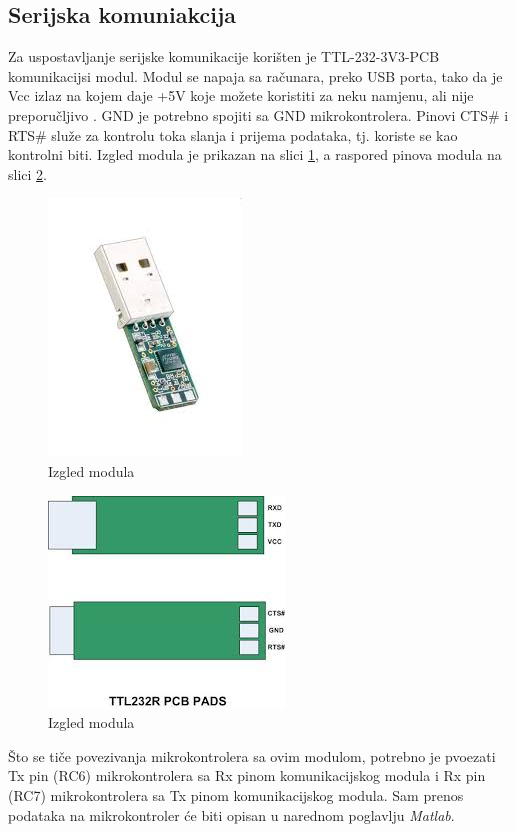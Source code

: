 \documentclass[12pt]{article}
\begin{document}
\subsection{Serijska komuniakcija}
Za uspostavljanje serijske komunikacije korišten je TTL-232-3V3-PCB komunikacijsi modul.
Modul se napaja sa računara, preko USB porta, tako da je Vcc izlaz na kojem daje +5V koje možete koristiti za neku namjenu, ali nije preporučljivo .
GND je potrebno spojiti sa GND mikrokontrolera.
Pinovi CTS# i RTS# služe za kontrolu toka
slanja i prijema podataka, tj. koriste se kao kontrolni biti. 
Izgled modula je prikazan na slici \ref{fig:izgleda}, a raspored pinova modula na slici \ref{fig:raspored}.
\begin{figure}[h!]
    \centering
  \includegraphics[scale=0.5]{izgledUSB.jpeg}
  \caption{Izgled modula}
  \label{fig:izgleda}
\end{figure}

\begin{figure}[h!]
    \centering
  \includegraphics[scale=0.5]{usbpinovi.jpeg}
  \caption{Izgled modula}
  \label{fig:raspored}
\end{figure}
\newline
Što se tiče povezivanja mikrokontrolera sa ovim modulom, potrebno je pvoezati Tx pin (RC6) mikrokontrolera sa Rx pinom komunikacijskog modula i Rx pin (RC7) mikrokontrolera sa Tx pinom komunikacijskog modula. 
\newline
Sam prenos podataka na mikrokontroler će biti opisan u narednom poglavlju \textit{Matlab}.
\end{document}
